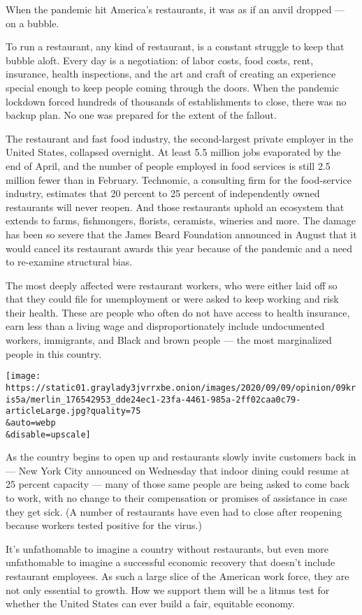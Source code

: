 When the pandemic hit America's restaurants, it was as if an anvil
dropped --- on a bubble.

To run a restaurant, any kind of restaurant, is a constant struggle to
keep that bubble aloft. Every day is a negotiation: of labor costs, food
costs, rent, insurance, health inspections, and the art and craft of
creating an experience special enough to keep people coming through the
doors. When the pandemic lockdown forced hundreds of thousands of
establishments to close, there was no backup plan. No one was prepared
for the extent of the fallout.

The restaurant and fast food industry, the second-largest private
employer in the United States, collapsed overnight. At least 5.5 million
jobs evaporated by the end of April, and the number of people employed
in food services is still 2.5 million fewer than in February. Technomic,
a consulting firm for the food-service industry, estimates that 20
percent to 25 percent of independently owned restaurants will never
reopen. And those restaurants uphold an ecosystem that extends to farms,
fishmongers, florists, ceramists, wineries and more. The damage has been
so severe that the James Beard Foundation announced in August that it
would cancel its restaurant awards this year because of the pandemic and
a need to re-examine structural bias.

The most deeply affected were restaurant workers, who were either laid
off so that they could file for unemployment or were asked to keep
working and risk their health. These are people who often do not have
access to health insurance, earn less than a living wage and
disproportionately include undocumented workers, immigrants, and Black
and brown people --- the most marginalized people in this country.

\texttt{[image: https://static01.graylady3jvrrxbe.onion/images/2020/09/09/opinion/09kris5a/merlin\_176542953\_dde24ec1-23fa-4461-985a-2ff02caa0c79-articleLarge.jpg?quality=75\\\&auto=webp\\\&disable=upscale]}

As the country begins to open up and restaurants slowly invite customers
back in --- New York City announced on Wednesday that indoor dining
could resume at 25 percent capacity --- many of those same people are
being asked to come back to work, with no change to their compensation
or promises of assistance in case they get sick. (A number of
restaurants have even had to close after reopening because workers
tested positive for the virus.)

It's unfathomable to imagine a country without restaurants, but even
more unfathomable to imagine a successful economic recovery that doesn't
include restaurant employees. As such a large slice of the American work
force, they are not only essential to growth. How we support them will
be a litmus test for whether the United States can ever build a fair,
equitable economy.


